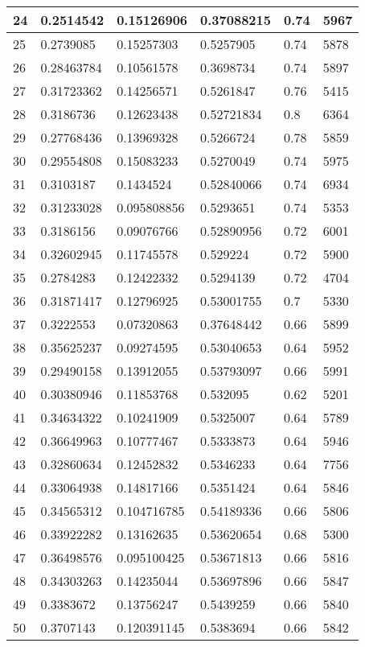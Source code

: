 \begin{longtable}{|l|l|l|l|l|l|}
24 & 0.2514542 & 0.15126906 & 0.37088215 & 0.74 & 5967 \\ \hline 
25 & 0.2739085 & 0.15257303 & 0.5257905 & 0.74 & 5878 \\ \hline 
26 & 0.28463784 & 0.10561578 & 0.3698734 & 0.74 & 5897 \\ \hline 
27 & 0.31723362 & 0.14256571 & 0.5261847 & 0.76 & 5415 \\ \hline 
28 & 0.3186736 & 0.12623438 & 0.52721834 & 0.8 & 6364 \\ \hline 
29 & 0.27768436 & 0.13969328 & 0.5266724 & 0.78 & 5859 \\ \hline 
30 & 0.29554808 & 0.15083233 & 0.5270049 & 0.74 & 5975 \\ \hline 
31 & 0.3103187 & 0.1434524 & 0.52840066 & 0.74 & 6934 \\ \hline 
32 & 0.31233028 & 0.095808856 & 0.5293651 & 0.74 & 5353 \\ \hline 
33 & 0.3186156 & 0.09076766 & 0.52890956 & 0.72 & 6001 \\ \hline 
34 & 0.32602945 & 0.11745578 & 0.529224 & 0.72 & 5900 \\ \hline 
35 & 0.2784283 & 0.12422332 & 0.5294139 & 0.72 & 4704 \\ \hline 
36 & 0.31871417 & 0.12796925 & 0.53001755 & 0.7 & 5330 \\ \hline 
37 & 0.3222553 & 0.07320863 & 0.37648442 & 0.66 & 5899 \\ \hline 
38 & 0.35625237 & 0.09274595 & 0.53040653 & 0.64 & 5952 \\ \hline 
39 & 0.29490158 & 0.13912055 & 0.53793097 & 0.66 & 5991 \\ \hline 
40 & 0.30380946 & 0.11853768 & 0.532095 & 0.62 & 5201 \\ \hline 
41 & 0.34634322 & 0.10241909 & 0.5325007 & 0.64 & 5789 \\ \hline 
42 & 0.36649963 & 0.10777467 & 0.5333873 & 0.64 & 5946 \\ \hline 
43 & 0.32860634 & 0.12452832 & 0.5346233 & 0.64 & 7756 \\ \hline 
44 & 0.33064938 & 0.14817166 & 0.5351424 & 0.64 & 5846 \\ \hline 
45 & 0.34565312 & 0.104716785 & 0.54189336 & 0.66 & 5806 \\ \hline 
46 & 0.33922282 & 0.13162635 & 0.53620654 & 0.68 & 5300 \\ \hline 
47 & 0.36498576 & 0.095100425 & 0.53671813 & 0.66 & 5816 \\ \hline 
48 & 0.34303263 & 0.14235044 & 0.53697896 & 0.66 & 5847 \\ \hline 
49 & 0.3383672 & 0.13756247 & 0.5439259 & 0.66 & 5840 \\ \hline 
50 & 0.3707143 & 0.120391145 & 0.5383694 & 0.66 & 5842 \\ \hline 
\end{longtable}